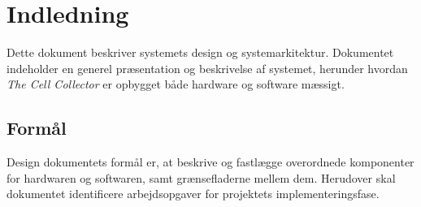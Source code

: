 \section{Indledning}
Dette dokument beskriver systemets design og systemarkitektur. Dokumentet indeholder en generel præsentation og beskrivelse af systemet, herunder hvordan \textit{The Cell Collector} er opbygget både hardware og software mæssigt.


\subsection{Formål}
Design dokumentets formål er, at beskrive og fastlægge overordnede komponenter for hardwaren og softwaren, samt grænsefladerne mellem dem.  
Herudover skal dokumentet identificere arbejdsopgaver for projektets implementeringsfase. 


